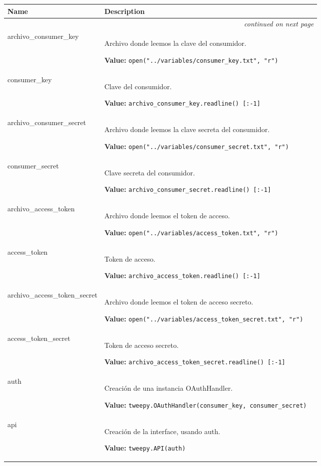     \vspace{-1cm}
\hspace{\varindent}\begin{longtable}{|p{\varnamewidth}|p{\vardescrwidth}|l}
\cline{1-2}
\cline{1-2} \centering \textbf{Name} & \centering \textbf{Description}& \\
\cline{1-2}
\endhead\cline{1-2}\multicolumn{3}{r}{\small\textit{continued on next page}}\\\endfoot\cline{1-2}
\endlastfoot\raggedright a\-r\-c\-h\-i\-v\-o\-\_\-c\-o\-n\-s\-u\-m\-e\-r\-\_\-k\-e\-y\- & \raggedright Archivo donde leemos la clave del consumidor.

\textbf{Value:} 
{\tt open("../variables/consumer\_key.txt", "r")}&\\
\cline{1-2}
\raggedright c\-o\-n\-s\-u\-m\-e\-r\-\_\-k\-e\-y\- & \raggedright Clave del consumidor.

\textbf{Value:} 
{\tt archivo\_consumer\_key.readline() [:-1]}&\\
\cline{1-2}
\raggedright a\-r\-c\-h\-i\-v\-o\-\_\-c\-o\-n\-s\-u\-m\-e\-r\-\_\-s\-e\-c\-r\-e\-t\- & \raggedright Archivo donde leemos la clave secreta del consumidor.

\textbf{Value:} 
{\tt open("../variables/consumer\_secret.txt", "r")}&\\
\cline{1-2}
\raggedright c\-o\-n\-s\-u\-m\-e\-r\-\_\-s\-e\-c\-r\-e\-t\- & \raggedright Clave secreta del consumidor.

\textbf{Value:} 
{\tt archivo\_consumer\_secret.readline() [:-1]}&\\
\cline{1-2}
\raggedright a\-r\-c\-h\-i\-v\-o\-\_\-a\-c\-c\-e\-s\-s\-\_\-t\-o\-k\-e\-n\- & \raggedright Archivo donde leemos el token de acceso.

\textbf{Value:} 
{\tt open("../variables/access\_token.txt", "r")}&\\
\cline{1-2}
\raggedright a\-c\-c\-e\-s\-s\-\_\-t\-o\-k\-e\-n\- & \raggedright Token de acceso.

\textbf{Value:} 
{\tt archivo\_access\_token.readline() [:-1]}&\\
\cline{1-2}
\raggedright a\-r\-c\-h\-i\-v\-o\-\_\-a\-c\-c\-e\-s\-s\-\_\-t\-o\-k\-e\-n\-\_\-s\-e\-c\-r\-e\-t\- & \raggedright Archivo donde leemos el token de acceso secreto.

\textbf{Value:} 
{\tt open("../variables/access\_token\_secret.txt", "r")}&\\
\cline{1-2}
\raggedright a\-c\-c\-e\-s\-s\-\_\-t\-o\-k\-e\-n\-\_\-s\-e\-c\-r\-e\-t\- & \raggedright Token de acceso secreto.

\textbf{Value:} 
{\tt archivo\_access\_token\_secret.readline() [:-1]}&\\
\cline{1-2}
\raggedright a\-u\-t\-h\- & \raggedright Creación de una instancia OAuthHandler.

\textbf{Value:} 
{\tt tweepy.OAuthHandler(consumer\_key, consumer\_secret)}&\\
\cline{1-2}
\raggedright a\-p\-i\- & \raggedright Creación de la interface, usando auth.

\textbf{Value:} 
{\tt tweepy.API(auth)}&\\
\cline{1-2}
\end{longtable}


